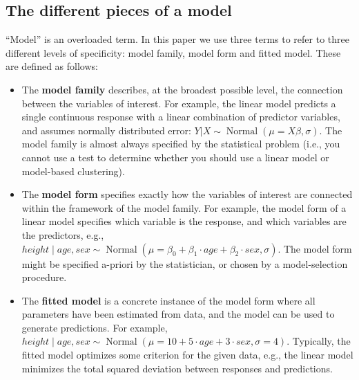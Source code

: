 \documentclass[preprint]{imsart}
\DeclareMathOperator{\Normal}{Normal}
\begin{document}
\subsection{The different pieces of a model}

``Model'' is an overloaded term. In this paper we use three terms to refer to three different levels of specificity: model family, model form and fitted model.  These are defined as follows:

\begin{itemize}

  \item The {\bf model family} describes, at the broadest possible level, the connection between the variables of interest. For example, the linear model predicts a single continuous response with a linear combination of predictor variables, and assumes normally distributed error: $Y | X \sim \Normal(\mu = X\beta, \sigma)$. The model family is almost always specified by the statistical problem (i.e., you cannot use a test to determine whether you should use a linear model or model-based clustering).

  \item The {\bf model form} specifies exactly how the variables of interest are connected within the framework of the model family. For example, the model form of a linear model specifies which variable is the response, and which variables are the predictors, e.g.,\ $height  \mid age, sex \sim \Normal(\mu = \beta_0 + \beta_1 \cdot age + \beta_2 \cdot sex, \sigma)$. The model form might be specified a-priori by the statistician, or chosen by a model-selection procedure.

  \item The {\bf fitted model} is a concrete instance of the model form where all parameters have been estimated from data, and the model can be used to generate predictions. For example, $height \mid age, sex \sim \Normal(\mu = 10 + 5 \cdot age + 3 \cdot sex, \sigma = 4)$. Typically, the fitted model optimizes some criterion for the given data, e.g., the linear model minimizes the total squared deviation between responses and predictions.

\end{itemize}
\end{document}
